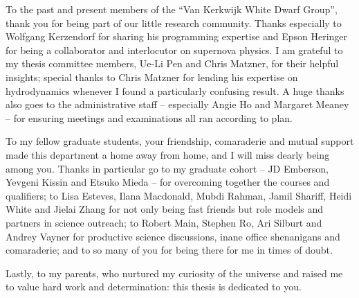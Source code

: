 \documentclass{ut-thesis}
\begin{document}
\begin{preliminary}
\begin{acknowledgements}

To the past and present members of the ``Van Kerkwijk White Dwarf Group'', thank you for being part of our little research community.  Thanks especially to Wolfgang Kerzendorf for sharing his programming expertise and Epson Heringer for being a collaborator and interlocutor on supernova physics.  I am grateful to my thesis committee members, Ue-Li Pen and Chris Matzner, for their helpful insights; special thanks to Chris Matzner for lending his expertise on hydrodynamics whenever I found a particularly confusing result.  A huge thanks also goes to the administrative staff -- especially Angie Ho and Margaret Meaney -- for ensuring meetings and examinations all ran according to plan.

To my fellow graduate students, your friendship, comaraderie and mutual support made this department a home away from home, and I will miss dearly being among you.  Thanks in particular go to my graduate cohort -- JD Emberson, Yevgeni Kissin and Etsuko Mieda -- for overcoming together the courses and qualifiers; to Lisa Esteves, Ilana Macdonald, Mubdi Rahman, Jamil Shariff, Heidi White and Jielai Zhang for not only being fast friends but role models and partners in science outreach; to Robert Main, Stephen Ro, Ari Silburt and Andrey Vayner for productive science discussions, inane office shenanigans and comaraderie; and to so many of you for being there for me in times of doubt.

Lastly, to my parents, who nurtured my curiosity of the universe and raised me to value hard work and determination: this thesis is dedicated to you.

\end{acknowledgements}

\tableofcontents


\listoffigures


\end{preliminary}
\end{document}
